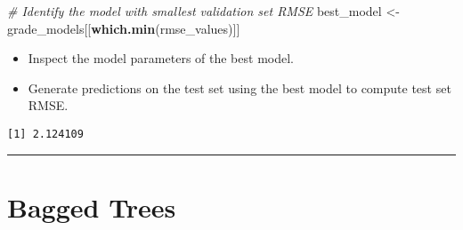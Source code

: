\documentclass[
]{book}
\newenvironment{Shaded}{\begin{snugshade}}{\end{snugshade}}
\newcommand{\CommentTok}[1]{\textcolor[rgb]{0.56,0.35,0.01}{\textit{#1}}}
\newcommand{\DataTypeTok}[1]{\textcolor[rgb]{0.13,0.29,0.53}{#1}}
\newcommand{\KeywordTok}[1]{\textcolor[rgb]{0.13,0.29,0.53}{\textbf{#1}}}
\newcommand{\NormalTok}[1]{#1}
\newcommand{\OperatorTok}[1]{\textcolor[rgb]{0.81,0.36,0.00}{\textbf{#1}}}
\newcommand{\StringTok}[1]{\textcolor[rgb]{0.31,0.60,0.02}{#1}}
\providecommand{\tightlist}{%
  \setlength{\itemsep}{0pt}\setlength{\parskip}{0pt}}
\begin{document}
\begin{Shaded}
\begin{Highlighting}[]
\CommentTok{# Identify the model with smallest validation set RMSE}
\NormalTok{best_model <-}\StringTok{ }\NormalTok{grade_models[[}\KeywordTok{which.min}\NormalTok{(rmse_values)]]}
\end{Highlighting}
\end{Shaded}

\begin{itemize}
\tightlist
\item
  Inspect the model parameters of the best model.
\end{itemize}

\begin{Shaded}
\end{Shaded}

\begin{itemize}
\tightlist
\item
  Generate predictions on the test set using the best model to compute test set RMSE.
\end{itemize}

\begin{Shaded}
\end{Shaded}

\begin{verbatim}
[1] 2.124109
\end{verbatim}

\begin{center}\rule{0.5\linewidth}{0.5pt}\end{center}

\hypertarget{bagged-trees}{%
\chapter{Bagged Trees}\label{bagged-trees}}
\end{document}
